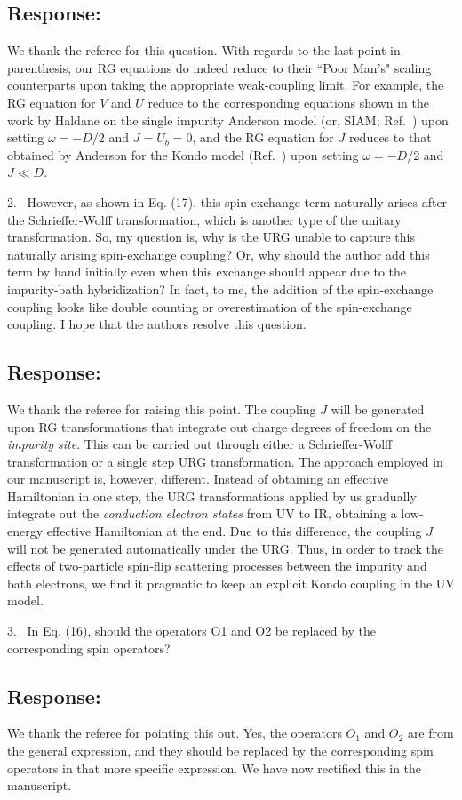 \documentclass{article}
\newcommand{\response}[1]{{\color{blue}\subsection*{Response:}{#1}\vspace*{10pt}}}
\begin{document}
\response{
We thank the referee for this question. With regards to the last point in parenthesis, our RG equations do indeed reduce to their ``Poor Man's" scaling counterparts upon taking the appropriate weak-coupling limit. For example, the RG equation for \(V\) and \(U\) reduce to the corresponding equations shown in the work by Haldane on the single impurity Anderson model (or, SIAM; Ref.~\cite{haldane1978scaling}) upon setting \(\omega = -D/2\) and \(J = U_b = 0\), and the RG equation for \(J\) reduces to that obtained by Anderson for the Kondo model (Ref.~\cite{anderson1970}) upon setting \(\omega = -D/2\) and \(J \ll D\). 
}

2.~
However, as shown in Eq. (17), this spin-exchange term naturally arises after the Schrieffer-Wolff transformation, which is another type of the unitary transformation. So, my question is, why is the URG unable to capture this naturally arising spin-exchange coupling? Or, why should the author add this term by hand initially even when this exchange should appear due to the impurity-bath hybridization?
In fact, to me, the addition of the spin-exchange coupling looks like double counting or overestimation of the spin-exchange coupling. I hope that the authors resolve this question.

\response{
We thank the referee for raising this point. 
The coupling \(J\) will be generated upon RG transformations that integrate out charge degrees of freedom on the {\it impurity site}. This can be carried out through either a Schrieffer-Wolff transformation or a single step URG transformation. The approach employed in our manuscript is, however, different. Instead of obtaining an effective Hamiltonian in one step, the URG transformations applied by us gradually integrate out the {\it conduction electron states} from UV to IR, obtaining a low-energy effective Hamiltonian at the end. Due to this difference, the coupling \(J\) will not be generated automatically under the URG. Thus, in order to track the effects of two-particle spin-flip scattering processes between the impurity and bath electrons, we find it pragmatic to keep an explicit Kondo coupling in the UV model.
}

3.~
In Eq. (16), should the operators O1 and O2 be replaced by the corresponding spin operators?

\response{
We thank the referee for pointing this out. Yes, the operators \(O_1\) and \(O_2\) are from the general expression, and they should be replaced by the corresponding spin operators in that more specific expression. We have now rectified this in the manuscript.
}
\end{document}
